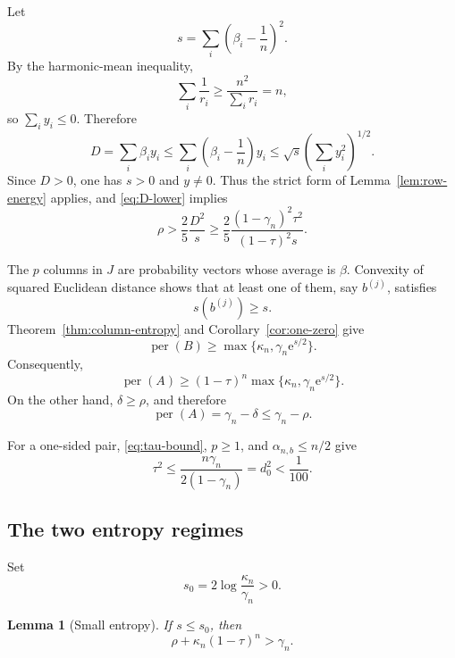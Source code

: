 \documentclass[11pt,a4paper]{article}
\numberwithin{equation}{section}
\newtheorem{lemma}[theorem]{Lemma}
\theoremstyle{definition}
\newcommand{\per}{\operatorname{per}}
\newcommand{\1}{\mathbf{1}}
\newcommand{\e}{\mathrm{e}}
\begin{document}
Let
\begin{equation}\label{eq:beta-s}
 s=\sum_i\left(\beta_i-\frac1n\right)^2.
\end{equation}
By the harmonic-mean inequality,
\[
 \sum_i\frac1{r_i}\ge\frac{n^2}{\sum_i r_i}=n,
\]
so $\sum_i y_i\le0$.  Therefore
\[
 D=\sum_i\beta_i y_i
 \le
 \sum_i\left(\beta_i-\frac1n\right)y_i
 \le\sqrt{s}\left(\sum_i y_i^2\right)^{1/2}.
\]
Since $D>0$, one has $s>0$ and $y\ne0$.  Thus the strict form of
Lemma~\ref{lem:row-energy} applies, and \eqref{eq:D-lower} implies
\begin{equation}\label{eq:rho-D-s}
 \rho>\frac25\frac{D^2}{s}
 \ge
 \frac25\frac{(1-\gamma_n)^2\tau^2}
 {(1-\tau)^2s}.
\end{equation}

The $p$ columns in $J$ are probability vectors whose average is $\beta$.  Convexity of squared Euclidean distance shows that at least one of them, say $b^{(j)}$, satisfies
\[
 s(b^{(j)})\ge s.
\]
Theorem~\ref{thm:column-entropy} and Corollary~\ref{cor:one-zero} give
\begin{equation}\label{eq:one-sided-per}
 \per(B)\ge
 \max\{\kappa_n,\gamma_n\e^{s/2}\}.
\end{equation}
Consequently,
\begin{equation}\label{eq:one-sided-lower}
 \per(A)\ge
 (1-\tau)^n\max\{\kappa_n,\gamma_n\e^{s/2}\}.
\end{equation}
On the other hand, $\delta\ge\rho$, and therefore
\begin{equation}\label{eq:one-sided-upper}
 \per(A)=\gamma_n-\delta\le\gamma_n-\rho.
\end{equation}

For a one-sided pair, \eqref{eq:tau-bound}, $p\ge1$, and $\alpha_{n,b}\le n/2$ give
\begin{equation}\label{eq:one-sided-tau}
 \tau^2\le\frac{n\gamma_n}{2(1-\gamma_n)}=d_0^2<\frac1{100}.
\end{equation}

\subsection{The two entropy regimes}

Set
\[
 s_0=2\log\frac{\kappa_n}{\gamma_n}>0.
\]

\begin{lemma}[Small entropy]\label{lem:small-entropy}
If $s\le s_0$, then
\begin{equation}\label{eq:small-contradiction}
 \rho+\kappa_n(1-\tau)^n>\gamma_n.
\end{equation}
\end{lemma}
\end{document}
